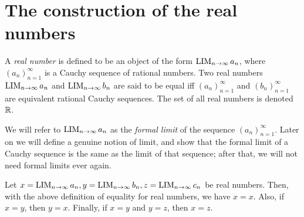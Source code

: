 \section{The construction of the real numbers}\label{i:sec:5.3}

\begin{defn}\label{i:5.3.1}
  A \emph{real number} is defined to be an object of the form \(\operatorname*{LIM}_{n \to \infty} a_n\), where \((a_n)_{n = 1}^{\infty}\) is a Cauchy sequence of rational numbers.
  Two real numbers \(\operatorname*{LIM}_{n \to \infty} a_n\) and \(\operatorname*{LIM}_{n \to \infty} b_n\) are said to be equal iff \((a_n)_{n = 1}^{\infty}\) and \((b_n)_{n = 1}^{\infty}\) are equivalent rational Cauchy sequences.
  The set of all real numbers is denoted \(\mathbb{R}\).
\end{defn}

\begin{note}
  We will refer to \(\operatorname*{LIM}_{n \to \infty} a_n\) as the \emph{formal limit} of the sequence \((a_n)_{n = 1}^{\infty}\).
  Later on we will define a genuine notion of limit, and show that the formal limit of a Cauchy sequence is the same as the limit of that sequence;
  after that, we will not need formal limits ever again.
\end{note}

\setcounter{thm}{2}
\begin{prop}\label{i:5.3.3}
  Let \(x = \operatorname*{LIM}_{n \to \infty} a_n, y = \operatorname*{LIM}_{n \to \infty} b_n, z = \operatorname*{LIM}_{n \to \infty} c_n\) be real numbers.
  Then, with the above definition of equality for real numbers, we have \(x = x\).
  Also, if \(x = y\), then \(y = x\).
  Finally, if \(x = y\) and \(y = z\), then \(x = z\).
\end{prop}

